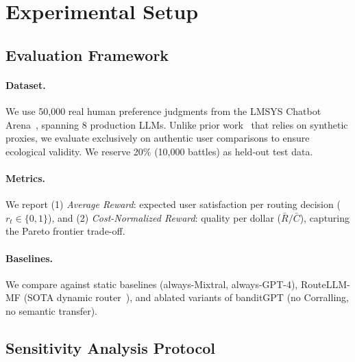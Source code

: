 
\section{Experimental Setup}
\label{sec:experiments}

\subsection{Evaluation Framework}

\paragraph{Dataset.}
We use 50,000 real human preference judgments from the LMSYS Chatbot Arena~\cite{zheng2023judging}, spanning 8 production LLMs. Unlike prior work~\cite{ong2024routellm} that relies on synthetic proxies, we evaluate exclusively on authentic user comparisons to ensure ecological validity. We reserve 20\% (10,000 battles) as held-out test data.

\paragraph{Metrics.}
We report (1) \textit{Average Reward}: expected user satisfaction per routing decision ($r_t \in \{0,1\}$), and (2) \textit{Cost-Normalized Reward}: quality per dollar ($\bar{R}/\bar{C}$), capturing the Pareto frontier trade-off.

\paragraph{Baselines.}
We compare against static baselines (always-Mixtral, always-GPT-4), RouteLLM-MF (SOTA dynamic router~\cite{ong2024routellm}), and ablated variants of banditGPT (no Corralling, no semantic transfer).

\subsection{Sensitivity Analysis Protocol}
\label{sec:sensitivity_protocol}

